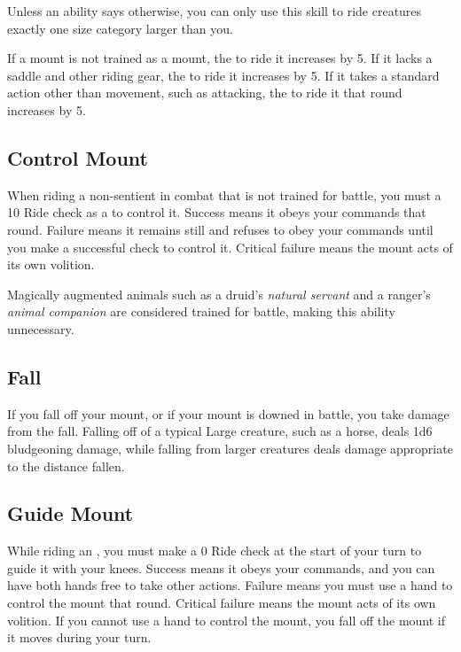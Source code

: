     Unless an ability says otherwise, you can only use this skill to ride creatures exactly one size category larger than you.

    \label{Ride Modifiers}
    If a mount is not trained as a mount, the  to ride it increases by 5.
    If it lacks a saddle and other riding gear, the  to ride it increases by 5.
    If it takes a standard action other than movement, such as attacking, the  to ride it that round increases by 5.

    \subsection{Control Mount}
        When riding a non-sentient  in combat that is not trained for battle, you must a  10 Ride check as a  to control it. Success means it obeys your commands that round. Failure means it remains still and refuses to obey your commands until you make a successful check to control it. Critical failure means the mount acts of its own volition.

        Magically augmented animals such as a druid's \textit{natural servant} and a ranger's \textit{animal companion} are considered trained for battle, making this ability unnecessary.

    \subsection{Fall}
        If you fall off your mount, or if your mount is downed in battle, you take damage from the fall.
        Falling off of a typical Large creature, such as a horse, deals 1d6 bludgeoning damage, while falling from larger creatures deals damage appropriate to the distance fallen.

    \subsection{Guide Mount}
        While riding an , you must make a  0 Ride check at the start of your turn to guide it with your knees. Success means it obeys your commands, and you can have both hands free to take other actions. Failure means you must use a hand to control the mount that round. Critical failure means the mount acts of its own volition. If you cannot use a hand to control the mount, you fall off the mount if it moves during your turn.

